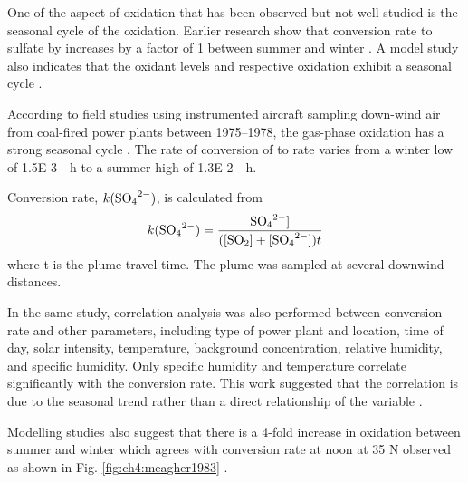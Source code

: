 One of the aspect of  oxidation that has been observed but not well-studied is the seasonal cycle of the oxidation. Earlier research show that  conversion rate to sulfate by  increases by a factor of 1 between summer and winter \citet{meagherSeasonalVariationAtmospheric1983}. A model study also indicates that the oxidant levels and respective oxidation exhibit a seasonal cycle \citet{feichterSimulationTroposphericSulfur1996}. 

According to field studies using instrumented aircraft sampling down-wind air from coal-fired power plants between 1975--1978, the gas-phase  oxidation has a strong seasonal cycle \citep{meagherSeasonalVariationAtmospheric1983}. The rate of conversion of  to  rate varies from a winter low of \qty{1.5E-3}{\per\hour} to a summer high of \qty{1.3E-2}{\per\hour}. 


Conversion rate, $k(\ce{SO4^2-})$, is calculated from
\begin{equation}
k(\ce{SO4^2-}) = \frac{\ce{SO4^2-}]}{([\ce{SO2}]+[\ce{SO4^2-}])t}
\end{equation}
where t is the plume travel time. The plume was sampled at several downwind distances.


In the same study, correlation analysis was also performed between conversion rate and other parameters, including type of power plant and location, time of day, solar intensity, temperature, background  concentration, relative humidity, and specific humidity. Only specific humidity and temperature correlate significantly with the conversion rate. This work suggested that the correlation is due to the seasonal trend rather than a direct relationship of the variable \citep{meagherSeasonalVariationAtmospheric1983}.


Modelling studies also suggest that there is a 4-fold increase in  oxidation between summer and winter which agrees with  conversion rate at noon at 35 \textdegree N observed as shown in Fig. \ref{fig:ch4:meagher1983} \citep{meagherSeasonalVariationAtmospheric1983}. 

